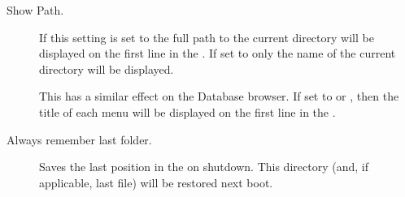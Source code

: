 \begin{description}
\item[Show Path.]
  If this setting is set to  the full path to the current
  directory will be displayed on the first line in the .
  If set to  only the name of the current
  directory will be displayed.
  
  This has a similar effect on the Database browser. If set to
   or , then the title of
  each menu will be displayed on the first line in the .

\item [Always remember last folder.]
  Saves the last position in the  on shutdown.
  This directory (and, if applicable, last file) will be restored next boot.

\end{description}
